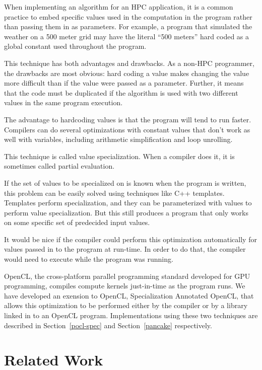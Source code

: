 \documentclass{acm_proc_article-sp}
\begin{document}
When implementing an algorithm for an HPC application, it is a common practice
to embed specific values used in the computation in the program rather than
passing them in as parameters. For example, a program that simulated the
weather on a 500 meter grid may have the literal ``500 meters'' hard coded
as a global constant used throughout the program.

This technique has both advantages and drawbacks. As a non-HPC programmer, the
drawbacks are most obvious: hard coding a value makes changing the value more
difficult than if the value were passed as a parameter. Further, it means that
the code must be duplicated if the algorithm is used with two different values
in the same program execution. 

The advantage to hardcoding values is that the program will tend to run faster.
Compilers can do several optimizations with constant values that don't work as
well with variables, including arithmetic simplification and loop unrolling.

This technique is called value specialization. When a compiler does it, it is
sometimes called partial evaluation\cite{Futamura:1971:PE}.

If the set of values to be specialized on is known when the program is written,
this problem can be easily solved using techniques like C++ templates.
Templates perform specialization, and they can be parameterized with values to
perform value specialization. But this still produces a program that only works
on some specific set of predecided input values.

It would be nice if the compiler could perform this optimization automatically
for values passed in to the program at run-time. In order to do that, the compiler
would need to execute while the program was running.

OpenCL, the cross-platform parallel programming standard developed for GPU
programming, compiles compute kernels just-in-time as the program runs. We have
developed an exension to OpenCL, Specialization Annotated OpenCL, that allows
this optimization to be performed either by the compiler or by a library linked
in to an OpenCL program. Implementations using these two techniques are
described in Section~\ref{pocl-spec} and Section~\ref{pancake} respectively.

\section{Related Work}
\end{document}
